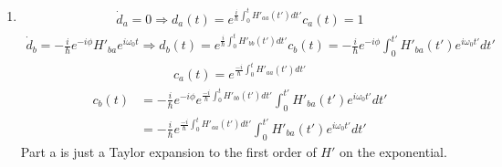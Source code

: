 \begin{enumerate}
\begin{align*}
              e^{\frac{i}{\hbar}\int_0^t H_{bb}(t')dt'}c_b \\
                       & =
              -\frac{i}{\hbar}
              H'_{ab}e^{-i\omega_0 t} e^{i\phi}
              d_b
          \end{align*}
          \begin{align*}
              \dot d_b & = \frac{i}{\hbar} H'_{bb}(t)
              e^{\frac{i}{\hbar}\int_0^t H'_{bb}(t')dt'}c_b
              +
              e^{\frac{i}{\hbar}\int_0^t H'_{bb}(t')dt'}\dot c_b \\
                       & =\frac{i}{\hbar} H'_{bb}(t)
              e^{\frac{i}{\hbar}\int_0^t H'_{bb}(t')dt'}c_b
              +
              e^{\frac{i}{\hbar}\int_0^t H'_{bb}(t')dt'}\left(-\frac{i}{\hbar}[c_b H'_{bb} + c_a H'_{ba}e^{i\omega_0 t}]\right)
              \\
                       & =
              -\frac{i}{\hbar}
              H'_{ba}e^{i\omega_0 t} e^{\frac{i}{\hbar}\int_0^t [-H'_{aa}(t') + H_{bb}(t')]dt'}
              e^{\frac{i}{\hbar}\int_0^t H_{aa}(t')dt'}c_a \\
                       & =
              -\frac{i}{\hbar}
              H'_{ba}e^{i\omega_0 t} e^{-i\phi}
              d_a
          \end{align*}
    \item
          \begin{align*}
              \dot d_a = 0 \Rightarrow d_a(t) = e^{\frac{i}{\hbar}\int_0^t H'_{aa}(t')dt'}c_a(t) = 1
          \end{align*}
          \begin{align*}
              \dot d_b = -\frac{i}{\hbar}e^{-i\phi}H'_{ba}e^{i\omega_0 t} \Rightarrow d_b(t) = e^{\frac{i}{\hbar}\int_0^t H'_{bb}(t')dt'}c_b(t) =
              -\frac{i}{\hbar}e^{-i\phi}
              \int_0^{t'}H'_{ba}(t')e^{i\omega_0 t'}dt'
          \end{align*}
          \begin{align*}
              c_a(t) = e^{\frac{-i}{\hbar}\int_0^t H'_{aa}(t')dt'}
          \end{align*}
          \begin{align*}
              c_b(t) & =
              -\frac{i}{\hbar}e^{-i\phi}
              e^{\frac{-i}{\hbar}\int_0^t H'_{bb}(t')dt'}
              \int_0^{t'}H'_{ba}(t')e^{i\omega_0 t'}dt' \\
                     & =
              -\frac{i}{\hbar}
              e^{\frac{-i}{\hbar}\int_0^t H'_{aa}(t')dt'}
              \int_0^{t'}H'_{ba}(t')e^{i\omega_0 t'}dt'
          \end{align*}
          Part a is just a Taylor expansion to the first order of $H'$ on the exponential.
\end{enumerate}
